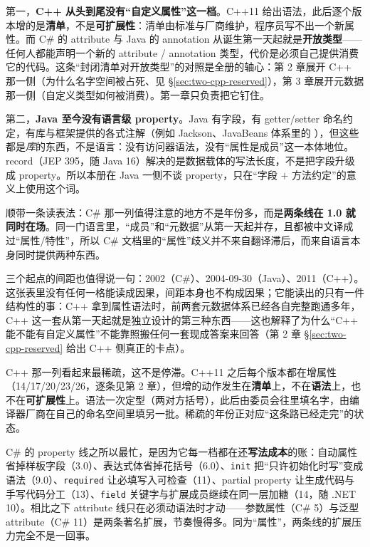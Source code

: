 \documentclass[12pt,a4paper,fontset=fandol]{ctexbook}
\newcommand{\cpp}[1]{C++#1}
\newcommand{\kw}[1]{\texttt{#1}}
\newcommand{\seqkw}[1]{\seqsplit{\texttt{#1}}}
\begin{document}
第一，\textbf{\cpp{} 从头到尾没有“自定义属性”这一档}。\cpp{11} 给出语法，此后逐个版本增的是\textbf{清单}，不是\textbf{可扩展性}：清单由标准与厂商维护，程序员写不出一个新属性。而 C\# 的 attribute 与 Java 的 annotation 从诞生第一天起就是\textbf{开放类型}——任何人都能声明一个新的 attribute / annotation 类型，代价是必须自己提供消费它的代码。这条“封闭清单对开放类型”的对照是全册的轴心：第 2 章展开 \cpp{} 那一侧（为什么名字空间被占死、见 \S\ref{sec:two-cpp-reserved}），第 3 章展开元数据那一侧（自定义类型如何被消费）。第一章只负责把它钉住。

第二，\textbf{Java 至今没有语言级 property}。Java 有字段，有 getter/setter 命名约定，有库与框架提供的各式注解（例如 Jackson、JavaBeans 体系里的 \seqkw{@Property}），但这些都是\emph{库}的东西，不是语言：没有访问器语法，没有“属性是成员”这一本体地位。record（JEP 395，随 Java 16）解决的是数据载体的写法长度，不是把字段升级成 property。所以本册在 Java 一侧不谈 property，只在“字段 $+$ 方法约定”的意义上使用这个词。

顺带一条读表法：C\# 那一列值得注意的地方不是年份多，而是\textbf{两条线在 1.0 就同时在场}。同一门语言里，“成员”和“元数据”从第一天起并存，且都被中文译成过“属性/特性”，所以 C\# 文档里的“属性”歧义并不来自翻译滞后，而来自语言本身同时提供两种东西。

三个起点的间距也值得说一句：2002（C\#）、2004-09-30（Java）、2011（\cpp{}）。这张表里没有任何一格能读成因果，间距本身也不构成因果；它能读出的只有一件结构性的事：\cpp{} 拿到属性语法时，前两套元数据体系已经各自完整跑通多年，\cpp{} 这一套从第一天起就是独立设计的第三种东西——这也解释了为什么“\cpp{} 能不能有自定义属性”不能靠照搬任何一套现成答案来回答（第 2 章 \S\ref{sec:two-cpp-reserved} 给出 \cpp{} 侧真正的卡点）。

\cpp{} 那一列看起来最稀疏，这不是停滞。\cpp{11} 之后每个版本都在增属性（14/17/20/23/26，逐条见第 2 章），但增的动作发生在\textbf{清单}上，不在\textbf{语法}上，也不在\textbf{可扩展性}上。语法一次定型（两对方括号），此后由委员会往里填名字，由编译器厂商在自己的命名空间里填另一批。稀疏的年份正对应“这条路已经走完”的状态。

C\# 的 property 线之所以最忙，是因为它每一档都在还\textbf{写法成本}的账：自动属性省掉样板字段（3.0）、表达式体省掉花括号（6.0）、\kw{init} 把“只许初始化时写”变成语法（9.0）、\kw{required} 让必填写入可检查（11）、partial property 让生成代码与手写代码分工（13）、\kw{field} 关键字与扩展成员继续在同一层加糖（14，随 .NET 10）。相比之下 attribute 线只在必须动语法时才动——参数属性（C\# 5）与泛型 attribute（C\# 11）是两条著名扩展，节奏慢得多。同为“属性”，两条线的扩展压力完全不是一回事。
\end{document}

